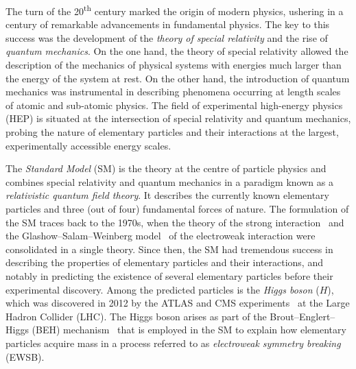 The turn of the 20\textsuperscript{th} century marked the origin of modern
physics, ushering in a century of remarkable advancements in fundamental
physics. The key to this success was the development of the \emph{theory of
  special relativity} and the rise of \emph{quantum mechanics}. On the one hand,
the theory of special relativity
%
allowed the description of the mechanics of physical systems with energies much
larger than the energy of the system at rest. On the other hand, the
introduction of quantum mechanics was instrumental in describing phenomena
occurring at length scales of atomic and sub-atomic physics. The field of
experimental high-energy physics (HEP) is situated at the intersection of
special relativity and quantum mechanics, probing the nature of elementary
particles and their interactions at the largest, experimentally accessible
energy scales.



The \emph{Standard Model} (SM) is the theory at the centre of particle physics
and combines special relativity and quantum mechanics in a paradigm known as a
\emph{relativistic quantum field theory}. It describes the currently known
elementary particles and three (out of four) fundamental forces of nature. The
formulation of the SM traces back to the 1970s, when the theory of the strong
interaction~\cite{Fritzsch:1973pi,Gross:1973id,Politzer:1973fx} and the
Glashow--Salam--Weinberg
model~\cite{Glashow:1961tr,Salam:1964ry,Weinberg:1967tq} of the electroweak
interaction were consolidated in a single theory. Since then, the SM had
tremendous success in describing the properties of elementary particles and
their interactions, and notably in predicting the existence of several
elementary particles before their experimental discovery. Among the predicted
particles is the \emph{Higgs boson} ($H$), which was discovered in 2012 by the
ATLAS and CMS experiments~\cite{HIGG-2012-27,CMS-HIG-12-028} at the Large Hadron
Collider (LHC). The Higgs boson arises as part of the Brout--Englert--Higgs
(BEH) mechanism~\cite{Englert:1964et,Higgs:1964pj} that is employed in the SM to
explain how elementary particles acquire mass in a process referred to as
\emph{electroweak symmetry breaking} (EWSB).


